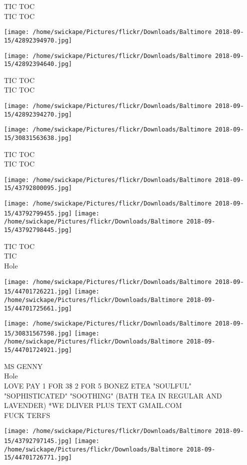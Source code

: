 \documentclass[10pt,letterpaper]{article}
\begin{document}
TIC TOC\\
TIC TOC
\pagebreak

\texttt{[image: /home/swickape/Pictures/flickr/Downloads/Baltimore 2018-09-15/42892394970.jpg]}

\vspace{0.25in}
\texttt{[image: /home/swickape/Pictures/flickr/Downloads/Baltimore 2018-09-15/42892394640.jpg]}

TIC TOC\\
TIC TOC
\pagebreak

\texttt{[image: /home/swickape/Pictures/flickr/Downloads/Baltimore 2018-09-15/42892394270.jpg]}

\vspace{0.25in}
\texttt{[image: /home/swickape/Pictures/flickr/Downloads/Baltimore 2018-09-15/30831563638.jpg]}

TIC TOC\\
TIC TOC
\pagebreak

\texttt{[image: /home/swickape/Pictures/flickr/Downloads/Baltimore 2018-09-15/43792800095.jpg]}

\vspace{0.25in}
\texttt{[image: /home/swickape/Pictures/flickr/Downloads/Baltimore 2018-09-15/43792799455.jpg]}
\texttt{[image: /home/swickape/Pictures/flickr/Downloads/Baltimore 2018-09-15/43792798445.jpg]}

TIC TOC\\
TIC\\
Hole
\pagebreak

\texttt{[image: /home/swickape/Pictures/flickr/Downloads/Baltimore 2018-09-15/44701726221.jpg]}
\texttt{[image: /home/swickape/Pictures/flickr/Downloads/Baltimore 2018-09-15/44701725661.jpg]}

\texttt{[image: /home/swickape/Pictures/flickr/Downloads/Baltimore 2018-09-15/30831567598.jpg]}
\texttt{[image: /home/swickape/Pictures/flickr/Downloads/Baltimore 2018-09-15/44701724921.jpg]}

MS GENNY\\
Hole\\
LOVE PAY 1 FOR 3\$ 2 FOR 5 BONEZ ETEA "SOULFUL" "SOPHISTICATED" "SOOTHING" (BATH TEA IN REGULAR AND LAVENDER) *WE DLIVER PLUS TEXT GMAIL.COM\\
FUCK TERFS
\pagebreak

\texttt{[image: /home/swickape/Pictures/flickr/Downloads/Baltimore 2018-09-15/43792797145.jpg]}
\texttt{[image: /home/swickape/Pictures/flickr/Downloads/Baltimore 2018-09-15/44701726771.jpg]}
\end{document}
